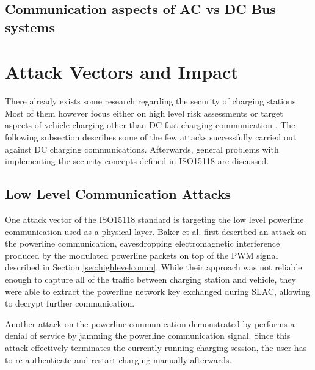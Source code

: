 \documentclass[conference,flushend]{iaria} %
\begin{document}
\subsection{Communication aspects of AC vs DC Bus systems}

\fi


\section{Attack Vectors and Impact} \label{sec:attackvectors}
There already exists some research regarding the security of charging stations. Most of them however focus either on high level risk assessments \cite{acharya_cybersecurity_2020, sanghvi_cybersecurity_2021, assi_ensuring_2023, mahrukh_load_2023, park_potential_2019, ahalawat_security_2022, bao_threat_2018} or target aspects of vehicle charging other than DC fast charging communication \cite{nasr_chargeprint_2023, sklyar_chargepoint_nodate, sarieddine_investigating_2023, nasr_large-scale_nodate, nasr_power_2022}.
The following subsection describes some of the few attacks successfully carried out against DC charging communications.
Afterwards, general problems with implementing the security concepts defined in ISO15118 are discussed.

\subsection{Low Level Communication Attacks}
One attack vector of the ISO15118 standard is targeting the low level powerline communication used as a physical layer.
Baker et al. \cite{baker_losing_2019} first described an attack on the powerline communication, eavesdropping electromagnetic interference produced by the modulated powerline packets on top of the PWM signal described in Section \ref{sec:highlevelcomm}.
While their approach was not reliable enough to capture all of the traffic between charging station and vehicle, they were able to extract the powerline network key exchanged during SLAC, allowing to decrypt further communication.

Another attack on the powerline communication demonstrated by \cite{kohler_brokenwire_2023} performs a denial of service by jamming the powerline communication signal.
Since this attack effectively terminates the currently running charging session, the user has to re-authenticate and restart charging manually afterwards.
\end{document}
